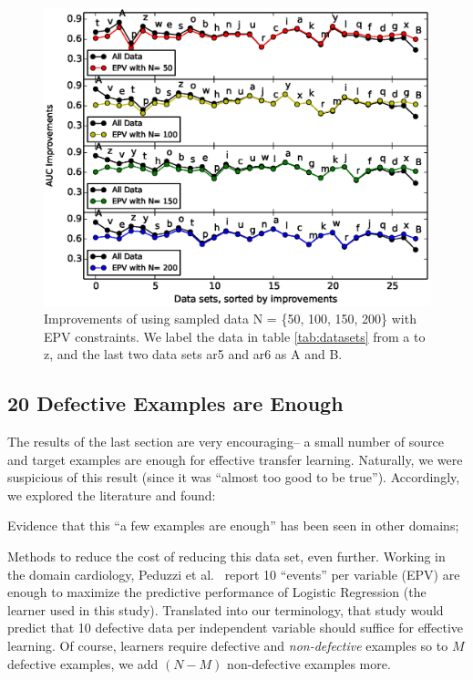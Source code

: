 \begin{figure}[t]
	\centering
	\includegraphics[width=\linewidth]{Figures/raleigh/sample_epv.eps}
	\caption{Improvements of using sampled data N = \{50, 100, 150, 200\} with EPV constraints. We label the data in table \ref{tab:datasets} from a to z, and the last two data sets ar5 and ar6 as A and B.}
	\label{fig:small_epv}
\end{figure}


\subsection{20 Defective Examples  are Enough}


The results of the last section are very encouraging-- a small number of source
and target examples are enough for effective transfer learning. Naturally,
we were suspicious of this result (since it was ``almost too good to be true'').
Accordingly, we explored the literature and found:
\bi
\item Evidence that this ``a few examples are enough'' has been seen in other domains;
\item Methods to reduce the cost of reducing this data set, even further.
  \ei
Working in the domain cardiology,
  Peduzzi et al.~\cite{peduzzi1996simulation}
  report 10 ``events'' per variable (EPV) are enough to maximize the predictive performance
  of  Logistic Regression (the learner used in this study). Translated into our terminology,
  that study would predict that  10 defective data per independent variable should
  suffice for effective learning. Of course, learners require defective and {\em non-defective}
  examples so to $M$ defective examples, we add $(N-M)$ non-defective examples more.

